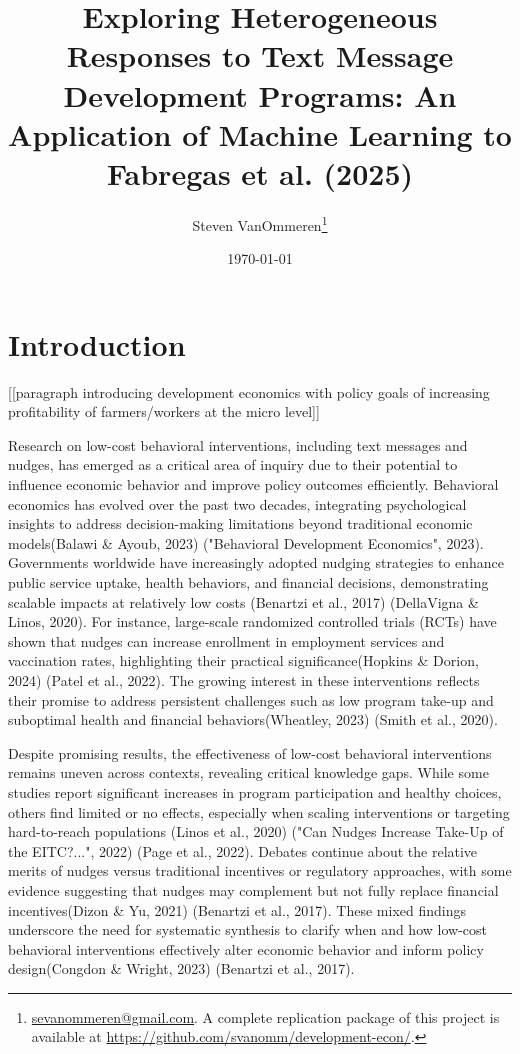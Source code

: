\documentclass[12pt]{article}
\begin{document}
\title{Exploring Heterogeneous Responses to Text Message Development Programs: An Application of Machine Learning to Fabregas et al. (2025)}
\author{Steven VanOmmeren\thanks{\href{mailto:sevanommeren@gmail.com}{sevanommeren@gmail.com}. A complete replication package of this project is available at \url{https://github.com/svanomm/development-econ/}.}}
\date{\today}
\maketitle
\begin{abstract}
\noindent
    
\end{abstract}
\newpage
\tableofcontents
\newpage

\doublespacing
\section{Introduction}

[[paragraph introducing development economics with policy goals of increasing profitability of farmers/workers at the micro level]]

Research on low-cost behavioral interventions, including text messages and nudges, has emerged as a critical area of inquiry due to their potential to influence economic behavior and improve policy outcomes efficiently. Behavioral economics has evolved over the past two decades, integrating psychological insights to address decision-making limitations beyond traditional economic models(Balawi \& Ayoub, 2023) ("Behavioral Development Economics", 2023). Governments worldwide have increasingly adopted nudging strategies to enhance public service uptake, health behaviors, and financial decisions, demonstrating scalable impacts at relatively low costs (Benartzi et al., 2017) (DellaVigna \& Linos, 2020). For instance, large-scale randomized controlled trials (RCTs) have shown that nudges can increase enrollment in employment services and vaccination rates, highlighting their practical significance(Hopkins \& Dorion, 2024) (Patel et al., 2022). The growing interest in these interventions reflects their promise to address persistent challenges such as low program take-up and suboptimal health and financial behaviors(Wheatley, 2023) (Smith et al., 2020).

Despite promising results, the effectiveness of low-cost behavioral interventions remains uneven across contexts, revealing critical knowledge gaps. While some studies report significant increases in program participation and healthy choices, others find limited or no effects, especially when scaling interventions or targeting hard-to-reach populations (Linos et al., 2020) ("Can Nudges Increase Take-Up of the EITC?...", 2022) (Page et al., 2022). Debates continue about the relative merits of nudges versus traditional incentives or regulatory approaches, with some evidence suggesting that nudges may complement but not fully replace financial incentives(Dizon \& Yu, 2021) (Benartzi et al., 2017). These mixed findings underscore the need for systematic synthesis to clarify when and how low-cost behavioral interventions effectively alter economic behavior and inform policy design(Congdon \& Wright, 2023) (Benartzi et al., 2017).
\end{document}

